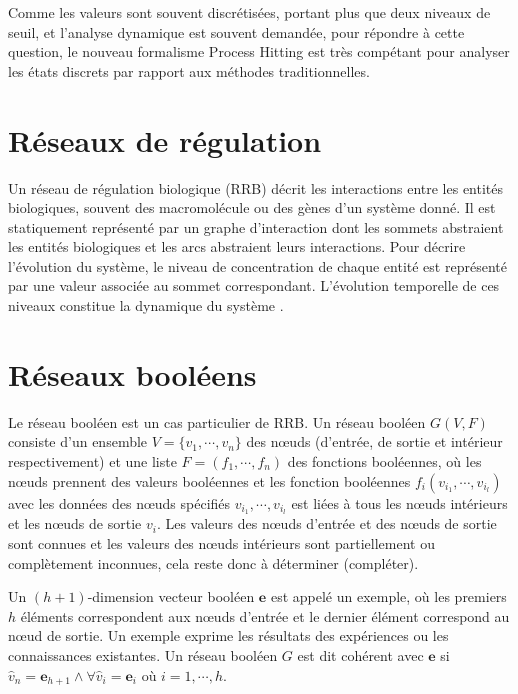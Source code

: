 \documentclass[11pt]{report}
\theoremstyle{definition}
\begin{document}
Comme les valeurs sont souvent discr\'etis\'ees, portant plus que deux niveaux de seuil, et l'analyse dynamique est souvent demand\'ee, pour r\'epondre \`a cette question, le nouveau formalisme Process Hitting est tr\`es comp\'etant pour analyser les \'etats discrets par rapport aux m\'ethodes traditionnelles. 

\section{R\'eseaux de r\'egulation}
Un r\'eseau de r\'egulation biologique (RRB) d\'ecrit les interactions entre les entit\'es biologiques, souvent des macromol\'ecule ou des g\`enes d'un syst\`eme donn\'e. Il est statiquement repr\'esent\'e par un graphe d'interaction dont les sommets abstraient les entit\'es biologiques et les arcs abstraient leurs interactions. Pour d\'ecrire l'\'evolution du syst\`eme, le niveau de concentration de chaque entit\'e est repr\'esent\'e par une valeur associ\'ee au sommet correspondant. L'\'evolution temporelle de ces niveaux constitue la dynamique du syst\`eme \citep{Richard2006}.
\section{R\'eseaux bool\'eens}
Le r\'eseau bool\'een est un cas particulier de RRB. Un r\'eseau bool\'een $G(V,F)$ consiste d'un ensemble $V=\{v_1,\cdots,v_n\}$ des n\oe uds (d'entr\'ee, de sortie et int\'erieur respectivement) et une liste $F=(f_1,\cdots,f_n)$ des fonctions bool\'eennes, o\`u les n\oe uds prennent des valeurs bool\'eennes et les fonction bool\'eennes $f_i (v_{i_1},\cdots,v_{i_l })$ avec les donn\'ees des n\oe uds sp\'ecifi\'es $v_{i_1} ,\cdots,v_{i_l} $ est li\'ees \`a tous les n\oe uds int\'erieurs et les n\oe uds de sortie $v_i$. Les valeurs des n\oe uds d'entr\'ee et des n\oe uds de sortie sont connues et les valeurs des n\oe uds int\'erieurs sont partiellement ou compl\`etement inconnues, cela reste donc \`a d\'eterminer (compl\'eter).

Un $(h+1)$-dimension vecteur bool\'een $\mathbf{e}$ est appel\'e un exemple, o\`u les premiers $h$ \'el\'ements correspondent aux n\oe uds d'entr\'ee et le dernier \'el\'ement correspond au n\oe ud de sortie. Un exemple exprime les r\'esultats des exp\'eriences ou les connaissances existantes. Un r\'eseau bool\'een $G$ est dit coh\'erent avec $\mathbf{e}$ si $\hat{v}_n=\mathbf{e}_{h+1}\land\forall\hat{v}_i=\mathbf{e}_i$ o\`u $i=1,\cdots,h$. 
\end{document}
